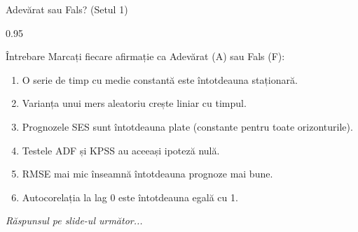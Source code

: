 \documentclass[9pt, aspectratio=169, t]{beamer}
\begin{document}
\begin{frame}{Adevărat sau Fals? (Setul 1)}
    \begin{cminipage}{0.95\textwidth}
    \begin{alertblock}{Întrebare}
        Marcați fiecare afirmație ca Adevărat (A) sau Fals (F):
    \end{alertblock}

    \vspace{0.3cm}

    \begin{enumerate}\setlength{\itemsep}{0pt}
        \item O serie de timp cu medie constantă este întotdeauna staționară. \hfill \underline{\hspace{1cm}}
        \vspace{0.2cm}
        \item Varianța unui mers aleatoriu crește liniar cu timpul. \hfill \underline{\hspace{1cm}}
        \vspace{0.2cm}
        \item Prognozele SES sunt întotdeauna plate (constante pentru toate orizonturile). \hfill \underline{\hspace{1cm}}
        \vspace{0.2cm}
        \item Testele ADF și KPSS au aceeași ipoteză nulă. \hfill \underline{\hspace{1cm}}
        \vspace{0.2cm}
        \item RMSE mai mic înseamnă întotdeauna prognoze mai bune. \hfill \underline{\hspace{1cm}}
        \vspace{0.2cm}
        \item Autocorelația la lag 0 este întotdeauna egală cu 1. \hfill \underline{\hspace{1cm}}
    \end{enumerate}

    \vspace{0.3cm}
    \begin{center}
        \textit{Răspunsul pe slide-ul următor...}
    \end{center}
    \end{cminipage}
\end{frame}
\end{document}
